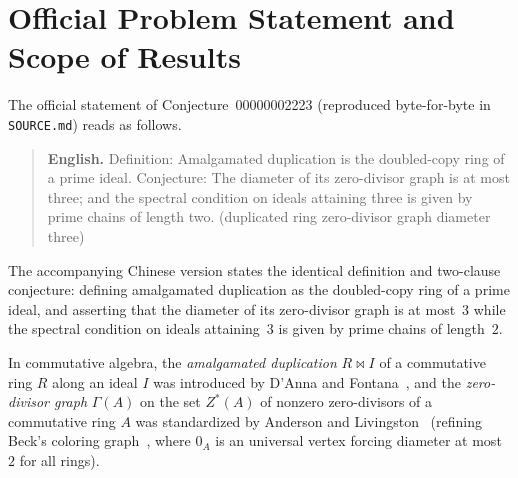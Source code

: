 \documentclass[11pt]{article}
\theoremstyle{definition}
\begin{document}
\section{Official Problem Statement and Scope of Results}

The official statement of Conjecture~00000002223 (reproduced byte-for-byte in
\texttt{SOURCE.md}) reads as follows.

\begin{quote}
\textbf{English.} Definition: Amalgamated duplication is the doubled-copy ring of a prime
ideal. Conjecture: The diameter of its zero-divisor graph is at most three; and the
spectral condition on ideals attaining three is given by prime chains of length two.
(duplicated ring zero-divisor graph diameter three)
\end{quote}

The accompanying Chinese version states the identical definition and two-clause
conjecture: defining amalgamated duplication as the doubled-copy ring of a prime ideal,
and asserting that the diameter of its zero-divisor graph is at most~$3$ while the
spectral condition on ideals attaining~$3$ is given by prime chains of length~$2$.

In commutative algebra, the \emph{amalgamated duplication} $R \bowtie I$ of a commutative
ring $R$ along an ideal $I$ was introduced by D'Anna and Fontana~\cite{DAnnaFontana2007,DAnna2007},
and the \emph{zero-divisor graph} $\Gamma(A)$ on the set $Z^*(A)$ of nonzero zero-divisors
of a commutative ring $A$ was standardized by Anderson and
Livingston~\cite{AndersonLivingston1999} (refining Beck's coloring graph~\cite{Beck1988},
where $0_A$ is an universal vertex forcing diameter at most~$2$ for all rings).
\end{document}

